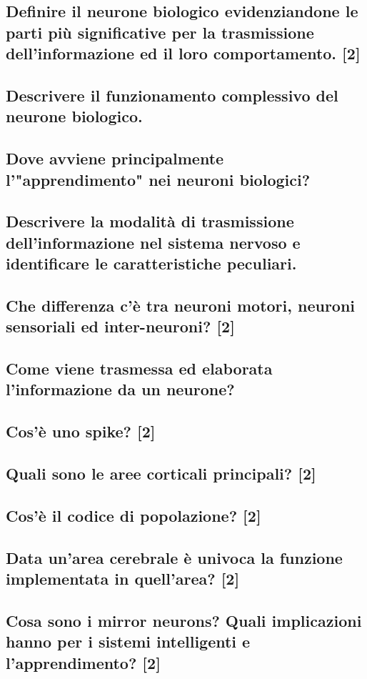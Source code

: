 \documentclass[\main/main.tex]{subfiles}
\begin{document}
\subsection{Definire il neurone biologico evidenziandone le parti più significative per la trasmissione dell'informazione ed il loro comportamento. [2]}
\subsection{Descrivere il funzionamento complessivo del neurone biologico.}
\subsection{Dove avviene principalmente l'"apprendimento" nei neuroni biologici?}
\subsection{Descrivere la modalità di trasmissione dell'informazione nel sistema nervoso e identificare le caratteristiche peculiari.}
\subsection{Che differenza c'è tra neuroni motori, neuroni sensoriali ed inter-neuroni? [2]}
\subsection{Come viene trasmessa ed elaborata l'informazione da un neurone?}
\subsection{ Cos'è uno spike? [2]}
\subsection{ Quali sono le aree corticali principali? [2]}
\subsection{Cos'è il codice di popolazione? [2]}
\subsection{Data un'area cerebrale è univoca la funzione implementata in quell'area? [2]}
\subsection{Cosa sono i mirror neurons? Quali implicazioni hanno per i sistemi intelligenti e l’apprendimento? [2]}
\end{document}
